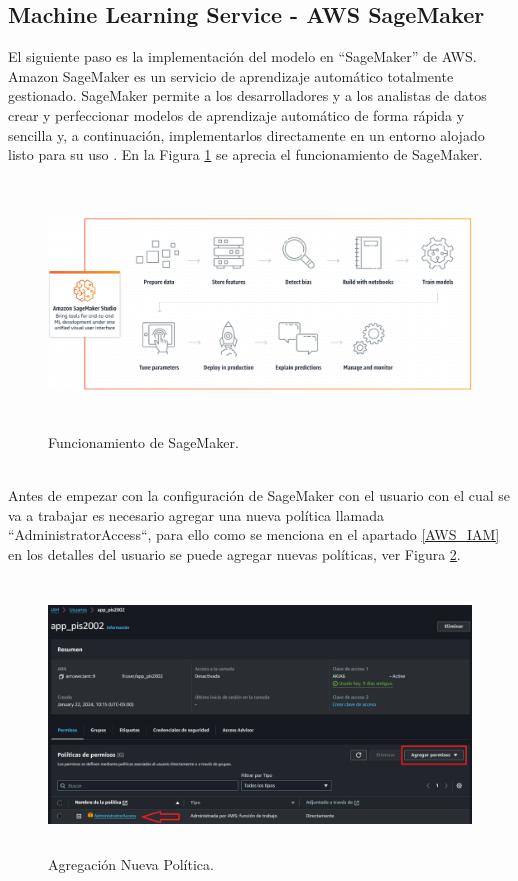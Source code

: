 \documentclass[a4paper,10pt, oneside, titlepage]{article}
\begin{document}
	\subsection{Machine Learning Service - AWS SageMaker}\label{AWS_SageMaker}
	El siguiente paso es la implementación del modelo en ``SageMaker'' de AWS. Amazon SageMaker es un servicio de aprendizaje automático totalmente gestionado. SageMaker permite a los desarrolladores y a los analistas de datos crear y perfeccionar modelos de aprendizaje automático de forma rápida y sencilla y, a continuación, implementarlos directamente en un entorno alojado listo para su uso \cite{SageMaker}. En la Figura \ref{Funcionamiento_SageMaker} se aprecia el funcionamiento de SageMaker.
	\begin{figure}[!h]
		\centering
		\includegraphics[width = 1\linewidth, height = 6.6cm]{Funcionamiento_SageMaker.png}
		\caption{Funcionamiento de SageMaker.}
		\label{Funcionamiento_SageMaker}
	\end{figure} \\
	\indent Antes de empezar con la configuración de SageMaker con el usuario con el cual se va a trabajar es necesario agregar una nueva política llamada ``AdministratorAccess``, para ello como se menciona en el apartado \ref{AWS_IAM} en los detalles del usuario se puede agregar nuevas políticas, ver Figura \ref{Nueva_Politica_SageMaker}.
	\begin{figure}[!h]
		\centering
		\includegraphics[width = 1\linewidth, height = 7.2cm]{Nueva_Politica_SageMaker.png}
		\caption{Agregación Nueva Política.}
		\label{Nueva_Politica_SageMaker}
	\end{figure} \\
\end{document}
